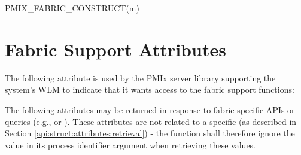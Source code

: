 \cspecificstart
\begin{codepar}
PMIX_FABRIC_CONSTRUCT(m)
\end{codepar}
\cspecificend

\begin{arglist}
\end{arglist}

\section{Fabric Support Attributes}
\label{api:fabric:attrs}

The following attribute is used by the \ac{PMIx} server library supporting the system's \ac{WLM} to indicate that it wants access to the fabric support functions:


\vspace{\baselineskip}
The following attributes may be returned in response to fabric-specific \acp{API} or queries (e.g.,  or ). These attributes are not related to a specific  (as described in Section \ref{api:struct:attributes:retrieval}) - the  function shall therefore ignore the value in its  process identifier argument when retrieving these values.

